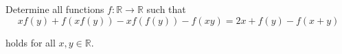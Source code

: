 Determine all functions $f:\mathbb{R} \to \mathbb{R}$ such that\[ xf(y) + f(xf(y))  - xf(f(y)) - f(xy) = 2x + f(y) - f(x+y)\]

holds for all $x,y \in \mathbb{R}$.